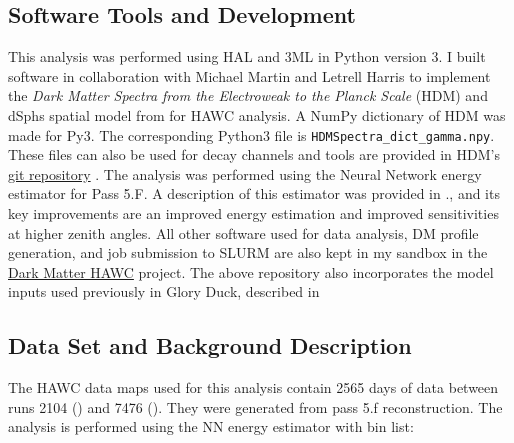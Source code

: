 \subsection{Software Tools and Development}\label{sec:mtd_tools}

This analysis was performed using HAL and 3ML \cite{Abeysekara_2017, vianello2015multimission} in Python version 3.
I built software in collaboration with Michael Martin and Letrell Harris to implement the \emph{Dark Matter Spectra from the Electroweak to the Planck Scale} (HDM) \cite{HDMSpectra} and dSphs spatial model from \cite{DM_Strigari20} for HAWC analysis.
A NumPy dictionary of HDM was made for Py3.
The corresponding Python3 file is \texttt{HDMSpectra\_dict\_gamma.npy}.
These files can also be used for decay channels and tools are provided in HDM's \href{https://github.com/nickrodd/HDMSpectra/tree/master}{git repository} \cite{HDMSpectra}.
The analysis was performed using the Neural Network energy estimator for Pass 5.F.
A description of this estimator was provided in ., and its key improvements are an improved energy estimation and improved sensitivities at higher zenith angles.
All other software used for data analysis, DM profile generation, and job submission to SLURM are also kept in my sandbox in the \href{https://gitlab.com/hawc-observatory/sandboxes/salaza82/dark_matter_hawc}{Dark Matter HAWC} project.
The above repository also incorporates the model inputs used previously in Glory Duck, described in 

\subsection{Data Set and Background Description} \label{sec:mtd_data_bkgd}

The HAWC data maps used for this analysis contain 2565 days of data between runs 2104 () and 7476 ().
They were generated from pass 5.f reconstruction.
The analysis is performed using the NN energy estimator with bin list:

